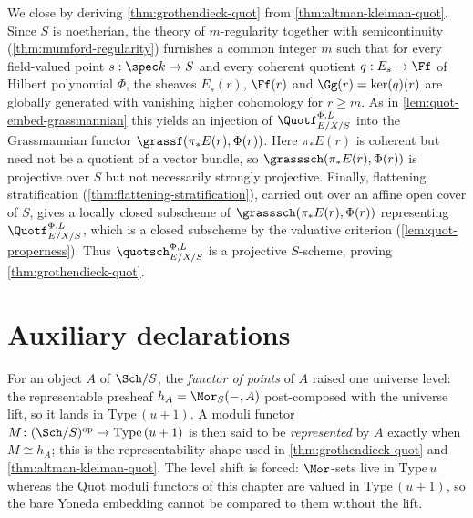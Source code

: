 We close by deriving \cref{thm:grothendieck-quot} from
\cref{thm:altman-kleiman-quot}. Since $S$ is noetherian, the theory of
$m$-regularity together with semicontinuity (\cref{thm:mumford-regularity})
furnishes a common integer $m$ such that for every field-valued point
$s : \spec k \to S$ and every coherent quotient $q : E_s \to \Ff$ of Hilbert
polynomial $\Phi$, the sheaves $E_s(r)$, $\Ff(r)$ and $\Gg(r) = \ker(q)(r)$ are
globally generated with vanishing higher cohomology for $r \ge m$. As in
\cref{lem:quot-embed-grassmannian} this yields an injection of
$\Quotf_{E/X/S}^{\Phi,L}$ into the Grassmannian functor
$\grassf(\pi_* E(r), \Phi(r))$. Here $\pi_* E(r)$ is coherent but need not be a
quotient of a vector bundle, so $\grasssch(\pi_* E(r), \Phi(r))$ is projective
over $S$ but not necessarily strongly projective. Finally, flattening
stratification (\cref{thm:flattening-stratification}), carried out over an
affine open cover of $S$, gives a locally closed subscheme of
$\grasssch(\pi_* E(r), \Phi(r))$ representing $\Quotf_{E/X/S}^{\Phi,L}$, which is
a closed subscheme by the valuative criterion
(\cref{lem:quot-properness}). Thus $\quotsch_{E/X/S}^{\Phi,L}$ is a projective
$S$-scheme, proving \cref{thm:grothendieck-quot}.

\section{Auxiliary declarations}

\begin{definition}

  \label{def:points-functor}
  For an object $A$ of $\Sch/S$, the \emph{functor of points} of $A$ raised one
  universe level: the representable presheaf $h_A = \Mor_S(-,A)$ post-composed
  with the universe lift, so it lands in $\mathrm{Type}\,(u+1)$. A moduli functor
  $M\colon(\Sch/S)^{\mathrm{op}}\to\mathrm{Type}\,(u+1)$ is then said to be
  \emph{represented} by $A$ exactly when $M\cong h_A$; this is the
  representability shape used in \cref{thm:grothendieck-quot} and
  \cref{thm:altman-kleiman-quot}. The level shift is forced: $\Mor$-sets live in
  $\mathrm{Type}\,u$ whereas the Quot moduli functors of this chapter are valued
  in $\mathrm{Type}\,(u+1)$, so the bare Yoneda embedding cannot be compared to
  them without the lift.
\end{definition}
